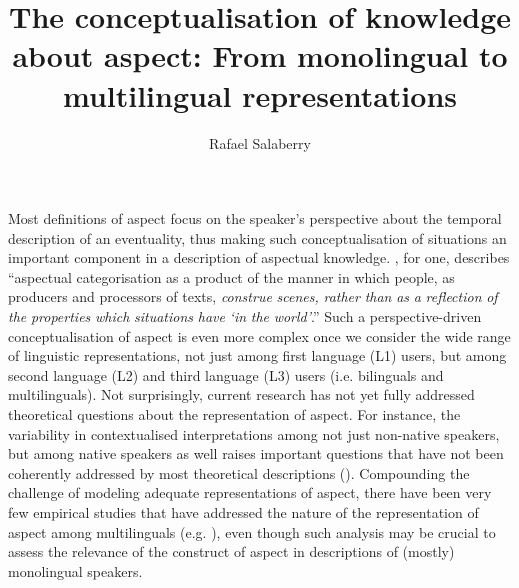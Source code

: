 \documentclass[output=paper,modfonts,nonflat,newtxmath]{langsci/langscibook}
\author{Rafael Salaberry \affiliation{Rice University}}
\title{The {conceptualisation} {of} {knowledge} {about} {aspect:} {From} {monolingual} {to} {multilingual} {representations} }
\begin{document}
\maketitle

%

Most definitions of aspect focus on the speaker’s perspective about the temporal description of an eventuality, thus making such conceptualisation of situations an important component in a description of aspectual knowledge. \citet[5, italics added]{Michaelis1998}, for one, describes “aspectual categorisation as a product of the manner in which people, as producers and processors of texts, \textit{construe} \textit{scenes,} \textit{rather} \textit{than} \textit{as} \textit{a} \textit{reflection} \textit{of} \textit{the} \textit{properties} \textit{which} \textit{situations} \textit{have} \textit{‘in} \textit{the} \textit{world’}.” Such a perspective-driven conceptualisation of aspect is even more complex once we consider the wide range of linguistic representations, not just among first language (L1) users, but among second language (L2) and third language (L3) users (i.e. bilinguals and multilinguals). Not surprisingly, current research has not yet fully addressed theoretical questions about the representation of aspect. For instance, the variability in contextualised interpretations among not just non-native speakers, but among native speakers as well raises important questions that have not been coherently addressed by most theoretical descriptions (\citealt{Salaberry2008, Ziegeler2008, Sasse2012}). Compounding the challenge of modeling adequate representations of aspect, there have been very few empirical studies that have addressed the nature of the representation of aspect among multilinguals (e.g. \citealt{Salaberry2005, Foote2009, DiaubalickGuijarro-Fuentes2016}), even though such analysis may be crucial to assess the relevance of the construct of aspect in descriptions of (mostly) monolingual speakers.
\end{document}
